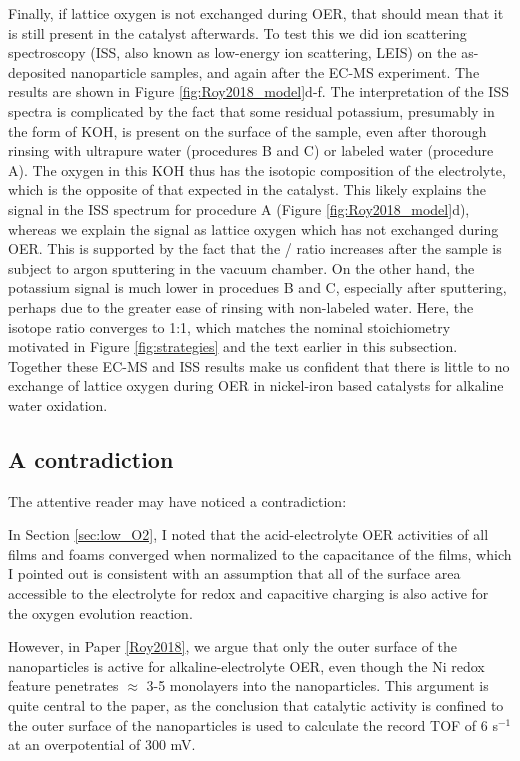 Finally, if lattice oxygen is not exchanged during OER, that should mean that it is still present in the catalyst afterwards. To test this we did ion scattering spectroscopy (ISS, also known as low-energy ion scattering, LEIS) on the as-deposited nanoparticle samples, and again after the EC-MS experiment. The results are shown in Figure \ref{fig:Roy2018_model}d-f. The interpretation of the ISS spectra is complicated by the fact that some residual potassium, presumably in the form of KOH, is present on the surface of the sample, even after thorough rinsing with ultrapure water (procedures B and C) or labeled water (procedure A). The oxygen in this KOH thus has the isotopic composition of the electrolyte, which is the opposite of that expected in the catalyst. This likely explains the  signal in the ISS spectrum for procedure A (Figure \ref{fig:Roy2018_model}d), whereas we explain the  signal as lattice oxygen which has not exchanged during OER. This is supported by the fact that the / ratio increases after the sample is subject to argon sputtering in the vacuum chamber. On the other hand, the potassium signal is much lower in procedues B and C, especially after sputtering, perhaps due to the greater ease of rinsing with non-labeled water. Here, the isotope ratio converges to 1:1, which matches the nominal stoichiometry motivated in Figure \ref{fig:strategies} and the text earlier in this subsection. Together these EC-MS and ISS results make us confident that there is little to no exchange of lattice oxygen during OER in nickel-iron based catalysts for alkaline water oxidation.

\subsection{A contradiction}

The attentive reader may have noticed a contradiction:

In Section \ref{sec:low_O2}, I noted that the acid-electrolyte OER activities of all  films and  foams converged when normalized to the capacitance of the films, which I pointed out is consistent with an assumption that all of the surface area accessible to the electrolyte for redox and capacitive charging is also active for the oxygen evolution reaction. 

However, in Paper \ref{Roy2018}, we argue that only the outer surface of the nanoparticles is active for alkaline-electrolyte OER, even though the Ni redox feature penetrates $\approx$ 3-5 monolayers into the nanoparticles. This argument is quite central to the paper, as the conclusion that catalytic activity is confined to the outer surface of the nanoparticles is used to calculate the record TOF of 6 s$^{-1}$ at an overpotential of 300 mV. 

